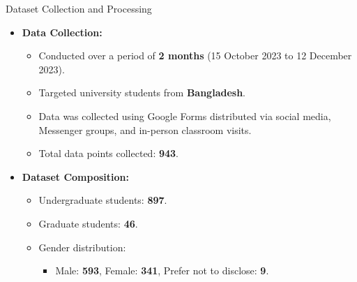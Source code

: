 \documentclass{beamer}
\begin{document}
\begin{frame}{Dataset Collection and Processing}
    \begin{itemize}
        \item \textbf{Data Collection:}
        \begin{itemize}
            \item Conducted over a period of \textbf{2 months} (15 October 2023 to 12 December 2023).
            \item Targeted university students from \textbf{Bangladesh}.
            \item Data was collected using Google Forms distributed via social media, Messenger groups, and in-person classroom visits.
            \item Total data points collected: \textbf{943}.
        \end{itemize}

        \item \textbf{Dataset Composition:}
        \begin{itemize}
            \item Undergraduate students: \textbf{897}.
            \item Graduate students: \textbf{46}.
            \item Gender distribution: 
            \begin{itemize}
                \item Male: \textbf{593}, Female: \textbf{341}, Prefer not to disclose: \textbf{9}.
            \end{itemize}
        \end{itemize}
    \end{itemize}
\end{frame}
\end{document}
